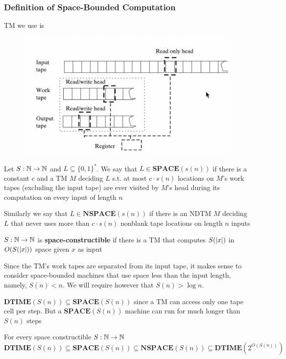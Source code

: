 \documentclass[11pt]{article}
\def \SPACE {\textbf{SPACE}}
\def \NSPACE {\textbf{NSPACE}}
\def \DTIME {\textbf{DTIME}}
\begin{document}
\subsubsection{Definition of Space-Bounded Computation}
\label{sec:org3d41438}
TM we use is
\begin{figure}[htbp]
\centering
\includegraphics[width=.7\textwidth]{../images/ComputationalComplexity/9.png}
\label{}
\end{figure}

\begin{definition}
Let \(S:\mathbb{N}\to\mathbb{N}\) and \(L\subseteq\{0,1\}^*\). We say that \(L\in\SPACE(s(n))\) if there is a
constant \(c\) and a TM \(M\) deciding \(L\) s.t. at most \(c\cdot s(n)\) locations on \(M\)'s
work tapes (excluding the input tape) are ever visited by \(M\)'s head during its computation on
every input of length \(n\)

Similarly we say that \(L\in\NSPACE(s(n))\) if there is an NDTM \(M\) deciding \(L\) that never
uses more than \(c\cdot s(n)\) nonblank tape locations on length \(n\) inputs
\end{definition}



\(S:\mathbb{N}\to\mathbb{N}\) is \textbf{space-constructible} if there is a TM that computes \(S(\abs{x})\)
in \(O(S(\abs{x}))\) space given \(x\) as input

Since the TM's work tapes are separated from its input tape, it makes sense to consider
space-bounded machines that use space less than the input length, namely, \(S(n)<n\). We will
require however that \(S(n)>\log n\).

\(\DTIME(S(n))\subseteq\SPACE(S(n))\) since a TM can access only one tape cell per step. But
a \(\SPACE(S(n))\) machine can run for much longer than \(S(n)\) steps

\begin{theorem}[]
\label{thm4.2}
For every space constructible \(S:\mathbb{N}\to\mathbb{N}\)
\begin{equation*}
\DTIME(S(n))\subseteq\SPACE(S(n))\subseteq\NSPACE(S(n))\subseteq\DTIME(2^{O(S(n))})
\end{equation*}
\end{theorem}
\end{document}
